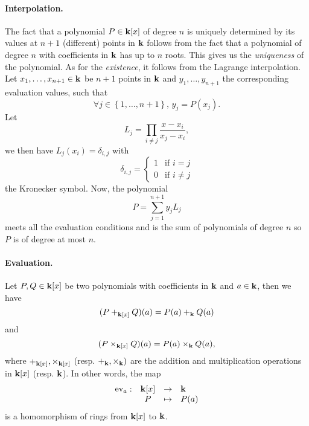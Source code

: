 \paragraph{Interpolation.} The fact that a polynomial $P\in\mathbf{k}[x]$ of degree $n$
is uniquely determined by its values at $n+1$ (different) points in $\mathbf{k}$ follows
from the fact that a polynomial of degree $n$ with coefficients in $\mathbf{k}$ has up
to $n$ roots. This gives us the \emph{uniqueness} of the polynomial. As for the
\emph{existence}, it follows from the Lagrange interpolation. Let $x_1, \dots,
x_{n+1}\in\mathbf{k}$ be $n+1$ points in $\mathbf{k}$ and $y_1, \dots, y_{n+1}$ the
corresponding evaluation values, such that
\[
  \forall j\in\left\{ 1, \dots, n+1 \right\},\,y_j = P(x_j).
\]
Let 
\[
  L_j = \prod_{i\neq j}\frac{x-x_i}{x_j-x_i},
\]
we then have $L_j(x_i) = \delta_{i, j}$ with
\[
  \delta_{i, j} = 
  \left\{\begin{array}{ll}
      1&\mbox{if } i=j\\
      0&\mbox{if } i\neq j
    \end{array}
    \right.
\]
the Kronecker symbol. Now, the polynomial
\[
  P = \sum_{j=1}^{n+1} y_j L_j
\]
meets all the evaluation conditions and is the sum of polynomials of degree $n$
so $P$ is of degree at most $n$.

\paragraph{Evaluation.} Let $P, Q\in\mathbf{k}[x]$ be two polynomials with coefficients
in $\mathbf{k}$ and $a\in\mathbf{k}$, then we have
\[
  (P+_{\mathbf{k}[x]}Q)(a) = P(a) +_{\mathbf{k}} Q(a)
\]
and 
\[
  (P\times_{\mathbf{k}[x]} Q)(a) = P(a) \times_{\mathbf{k}} Q(a),
\]
where $+_{\mathbf{k}[x]}, \times_{\mathbf{k}[x]}$ (resp. $+_{\mathbf{k}}, \times_{\mathbf{k}})$ are the addition
and multiplication operations in $\mathbf{k}[x]$ (resp. $\mathbf{k}$).
In other words, the map
\[
\begin{array}{lccl}
  \textrm{ev}_a:&\mathbf{k}[x]&\to&\mathbf{k}\\
  &P&\mapsto&P(a)
\end{array}
\]
is a homomorphism of rings from $\mathbf{k}[x]$ to $\mathbf{k}$.

